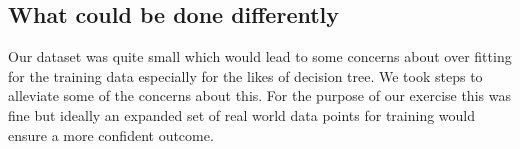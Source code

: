 \documentclass[conference]{IEEEtran}
\begin{document}
\subsection{What could be done differently}
Our dataset was quite small which would lead to some concerns about over fitting for the training data especially for the likes of decision tree. We took steps to alleviate some of the concerns about this. For the purpose of our exercise this was fine but ideally an expanded set of real world data points for training would ensure a more confident outcome.
\newpage
\clearpage
\tableofcontents
\printbibliography
\listoffigures
\end{document}
